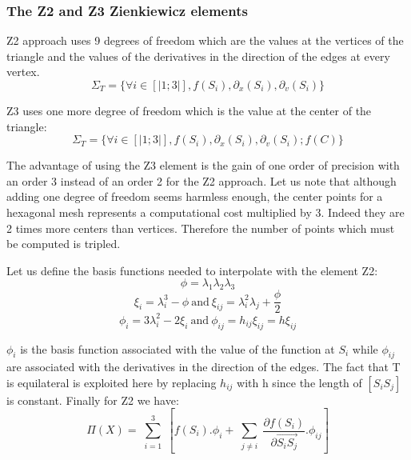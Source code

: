 \documentclass[proc]{edpsmath}
\begin{document}
\subsubsection{The Z2 and Z3 Zienkiewicz elements}
Z2 approach uses 9 degrees of freedom which are the values at the vertices of the triangle and the values of the derivatives in the direction of the edges at every vertex.
\begin{equation*}
 \Sigma_T = \lbrace \forall i \in [|1;3|], f(S_i),\partial_x(S_i),\partial_v(S_i) \rbrace 
\end{equation*}

 \noindent Z3 uses one more degree of freedom which is the value at the center of the triangle:
\begin{equation*}
 \Sigma_T = \lbrace \forall i \in [|1;3|], f(S_i),\partial_x(S_i),\partial_v(S_i); f(C) \rbrace 
\end{equation*}

 \noindent The advantage of using the Z3 element is the gain of one order of precision with an order 3 instead of an order 2 for the Z2 approach. Let us note that although adding one degree of freedom seems harmless enough, the center points for a hexagonal mesh represents a computational cost multiplied by 3. Indeed they are  2 times more centers than vertices. Therefore the number of points which must be computed is tripled. 
 
Let us define the basis functions needed to interpolate with the element Z2: 
\begin{equation*}
\phi = \lambda_1 \lambda_2 \lambda_3 
\end{equation*}
\begin{equation*}
\xi _i= \lambda_i^3 - \phi ~\text{and}~ \xi_{ij}= \lambda_{i}^2 \lambda_j + \frac{\phi}{2} 
\end{equation*}
\begin{equation*}
\phi_i = 3\lambda_{i}^2 -2 \xi_i ~\text{and} ~\phi_{ij} = h_{ij} \xi_{ij}=h \xi_{ij}
\end{equation*}


\noindent $\phi_i$ is the basis function associated with the value of the function at $S_i$ while $\phi_{ij}$ are associated with the derivatives in the direction of the edges.    
The fact that T is equilateral is exploited here by replacing $h_{ij}$ with h since the length of $ [S_iS_j]$ is constant. Finally for Z2 we have:
\begin{equation*}
 \Pi (X) = \sum \limits_{\substack{i=1 }}^{3}{ [f(S_i).\phi_i + \sum \limits_{\substack{j\neq i }}^{}{ \frac{\partial f(S_i)}{\partial  \overrightarrow{ S_i S_j } }.\phi_{ij} } ] } 
\end{equation*}
\end{document}
